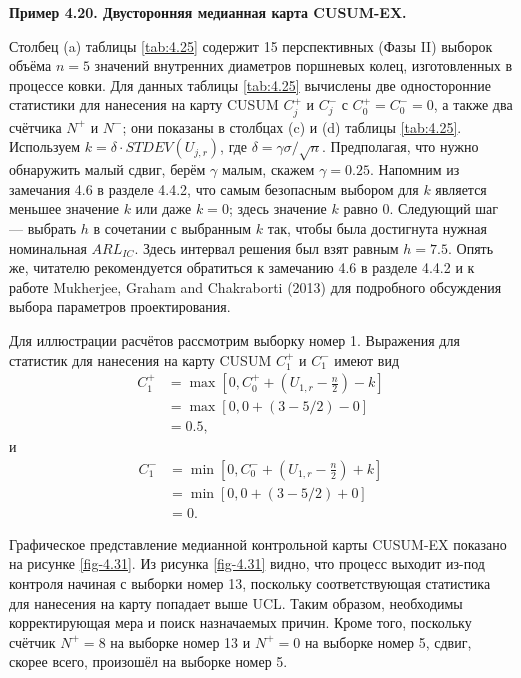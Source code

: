 \noindent\textbf{Пример 4.20. Двусторонняя медианная карта CUSUM-EX.}

Столбец (a) таблицы \ref{tab:4.25} содержит 15 перспективных (Фазы II) выборок объёма \(n = 5\) значений внутренних диаметров поршневых колец, изготовленных в процессе ковки. Для данных таблицы \ref{tab:4.25} вычислены две односторонние статистики для нанесения на карту CUSUM \(C_j^+\) и \(C_j^-\) с \(C_0^+ = C_0^- = 0\), а также два счётчика \(N^+\) и \(N^-\); они показаны в столбцах (c) и (d) таблицы \ref{tab:4.25}. Используем \(k = \delta \cdot STDEV(U_{j,r})\), где \(\delta = \gamma\sigma/\sqrt{n}\). Предполагая, что нужно обнаружить малый сдвиг, берём \(\gamma\) малым, скажем \(\gamma = 0.25\). Напомним из замечания 4.6 в разделе 4.4.2, что самым безопасным выбором для \(k\) является меньшее значение \(k\) или даже \(k = 0\); здесь значение \(k\) равно 0. Следующий шаг --- выбрать \(h\) в сочетании с выбранным \(k\) так, чтобы была достигнута нужная номинальная \(ARL_{IC}\). Здесь интервал решения был взят равным \(h = 7.5\). Опять же, читателю рекомендуется обратиться к замечанию 4.6 в разделе 4.4.2 и к работе Mukherjee, Graham and Chakraborti (2013) для подробного обсуждения выбора параметров проектирования.

Для иллюстрации расчётов рассмотрим выборку номер 1. Выражения для статистик для нанесения на карту CUSUM \(C_1^+\) и \(C_1^-\) имеют вид
\begin{align*}
	C_1^+ &= \max\left[ 0, C_0^+ + \left( U_{1,r} - \frac{n}{2} \right) - k \right] \\
	      &= \max\left[ 0, 0 + (3 - 5/2) - 0 \right] \\
	      &= 0.5,
\end{align*}
и
\begin{align*}
	C_1^- &= \min\left[ 0, C_0^- + \left( U_{1,r} - \frac{n}{2} \right) + k \right] \\
	      &= \min\left[ 0, 0 + (3 - 5/2) + 0 \right] \\
	      &= 0.
\end{align*}

Графическое представление медианной контрольной карты CUSUM-EX показано на рисунке \ref{fig-4.31}. Из рисунка \ref{fig-4.31} видно, что процесс выходит из-под контроля начиная с выборки номер 13, поскольку соответствующая статистика для нанесения на карту попадает выше UCL. Таким образом, необходимы корректирующая мера и поиск назначаемых причин. Кроме того, поскольку счётчик \(N^+ = 8\) на выборке номер 13 и \(N^+ = 0\) на выборке номер 5, сдвиг, скорее всего, произошёл на выборке номер 5.

